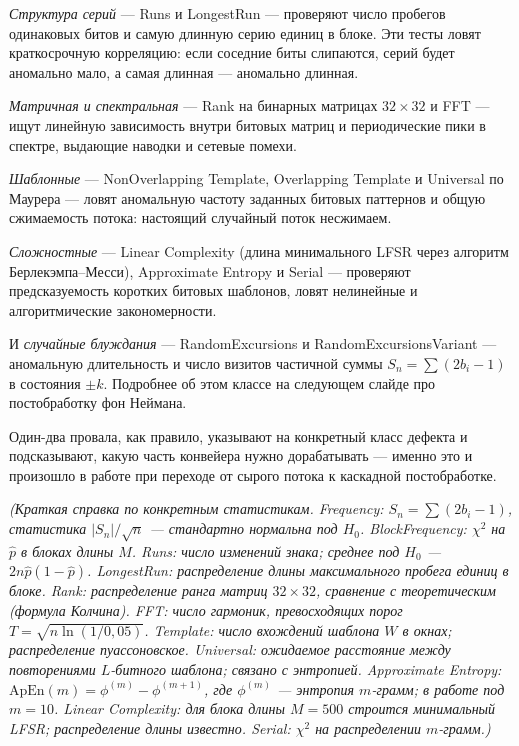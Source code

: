 \documentclass[12pt,a4paper]{extarticle}
\newcommand{\note}[1]{%
  \par
  {\small\color{noteclr}\itshape (#1)}%
  \par}
\begin{document}
\emph{Структура серий} --- Runs и LongestRun --- проверяют число пробегов
одинаковых битов и самую длинную серию единиц в блоке. Эти тесты ловят
краткосрочную корреляцию: если соседние биты слипаются, серий будет
аномально мало, а самая длинная --- аномально длинная.

\emph{Матричная и спектральная} --- Rank на бинарных матрицах
$32\times 32$ и FFT --- ищут линейную зависимость внутри битовых матриц и
периодические пики в спектре, выдающие наводки и сетевые помехи.

\emph{Шаблонные} --- NonOverlapping Template, Overlapping Template и
Universal по Маурера --- ловят аномальную частоту заданных битовых
паттернов и общую сжимаемость потока: настоящий случайный поток
несжимаем.

\emph{Сложностные} --- Linear Complexity (длина минимального LFSR через
алгоритм Берлекэмпа--Месси), Approximate Entropy и Serial --- проверяют
предсказуемость коротких битовых шаблонов, ловят нелинейные и
алгоритмические закономерности.

И \emph{случайные блуждания} --- RandomExcursions и RandomExcursionsVariant ---
аномальную длительность и число визитов частичной суммы $S_n = \sum (2b_i-1)$
в состояния $\pm k$. Подробнее об этом классе на следующем слайде про
постобработку фон Неймана.

Один-два провала, как правило, указывают на конкретный класс дефекта и
подсказывают, какую часть конвейера нужно дорабатывать --- именно это и
произошло в работе при переходе от сырого потока к каскадной постобработке.

\note{Краткая справка по конкретным статистикам.
\emph{Frequency}: $S_n = \sum (2b_i-1)$, статистика $|S_n|/\sqrt{n}$ ---
стандартно нормальна под $H_0$. \emph{BlockFrequency}: $\chi^2$ на $\hat p$
в блоках длины $M$. \emph{Runs}: число изменений знака; среднее под $H_0$ ---
$2n\hat p(1-\hat p)$. \emph{LongestRun}: распределение длины максимального
пробега единиц в блоке. \emph{Rank}: распределение ранга матриц $32\times 32$,
сравнение с теоретическим (формула Колчина). \emph{FFT}: число
гармоник, превосходящих порог $T = \sqrt{n\ln(1/0{,}05)}$. \emph{Template}:
число вхождений шаблона $W$ в окнах; распределение пуассоновское.
\emph{Universal}: ожидаемое расстояние между повторениями
$L$-битного шаблона; связано с энтропией. \emph{Approximate Entropy}:
$\text{ApEn}(m) = \phi^{(m)} - \phi^{(m+1)}$, где $\phi^{(m)}$ ---
энтропия $m$-грамм; в работе под $m=10$. \emph{Linear Complexity}:
для блока длины $M = 500$ строится минимальный LFSR; распределение
длины известно. \emph{Serial}: $\chi^2$ на распределении $m$-грамм.}
\end{document}
